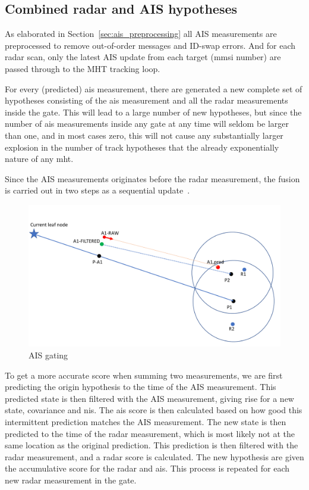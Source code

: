\subsection{Combined radar and AIS hypotheses}\label{subsec:combined_radar_and_ais_hypotheses}
As elaborated in Section~\ref{sec:ais_preprocessing} all AIS measurements are preprocessed to remove out-of-order messages and ID-swap errors. And for each radar scan, only the latest AIS update from each target (\gls{mmsi} number) are passed through to the MHT tracking loop.

For every (predicted) \gls{ais} measurement, there are generated a new complete set of hypotheses consisting of the \gls{ais} measurement and all the radar measurements inside the gate. This will lead to a large number of new hypotheses, but since the number of \gls{ais} measurements inside any gate at any time will seldom be larger than one, and in most cases zero, this will not cause any substantially larger explosion in the number of track hypotheses that the already exponentially nature of any \gls{mht}.%

Since the AIS measurements originates before the radar measurement, the fusion is carried out in two steps as a sequential update~\cite{Bar-Shalom1995}. 
\begin{figure}[H]
\centering
\includegraphics[width = .8\textwidth]{Figures/AIS_gating.pdf}
\caption{AIS gating}\label{fig:ais_gating}
\end{figure}
To get a more accurate score when summing two measurements, we are first predicting the origin hypothesis to the time of the AIS measurement. This predicted state is then filtered with the AIS measurement, giving rise for a new state, covariance and \gls{nis}. The \gls{ais} score is then calculated based on how good this intermittent prediction matches the AIS measurement. The new state is then predicted to the time of the radar measurement, which is most likely not at the same location as the original prediction. This prediction is then filtered with the radar measurement, and a radar score is calculated. The new hypothesis are given the accumulative score for the radar and \gls{ais}. This process is repeated for each new radar measurement in the gate.


